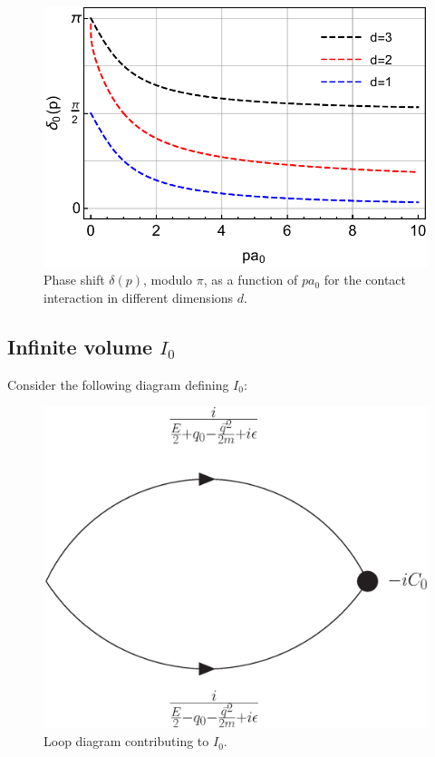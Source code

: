 \documentclass[11pt]{article}
\begin{document}
\begin{figure}
\center
\includegraphics[width=.8\columnwidth]{figure/phaseShift.pdf}
\caption{Phase shift $\delta(p)$, modulo $\pi$, as a function of $pa_0$ for the contact interaction in different dimensions $d$. \label{fig:phaseShifts}}
\end{figure}

\subsection{Infinite volume $I_0$}
Consider the following diagram defining $I_0$:
\begin{figure}[h!]
\center
\includegraphics[width=.5\columnwidth]{figure/I0.eps}
\caption{Loop diagram contributing to $I_0$.\label{fig:I0}}
\end{figure}
\end{document}
